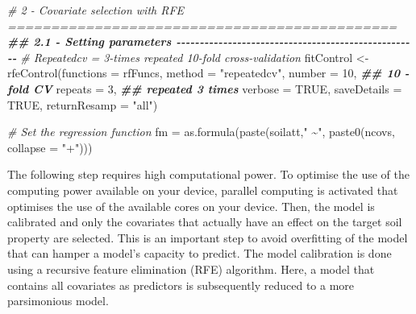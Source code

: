 \documentclass[
  10pt,
  b5paper,
  oneside]{book}
\newenvironment{Shaded}{\begin{snugshade}}{\end{snugshade}}
\newcommand{\AttributeTok}[1]{\textcolor[rgb]{0.77,0.63,0.00}{#1}}
\newcommand{\CommentTok}[1]{\textcolor[rgb]{0.56,0.35,0.01}{\textit{#1}}}
\newcommand{\ConstantTok}[1]{\textcolor[rgb]{0.00,0.00,0.00}{#1}}
\newcommand{\DecValTok}[1]{\textcolor[rgb]{0.00,0.00,0.81}{#1}}
\newcommand{\DocumentationTok}[1]{\textcolor[rgb]{0.56,0.35,0.01}{\textbf{\textit{#1}}}}
\newcommand{\FunctionTok}[1]{\textcolor[rgb]{0.00,0.00,0.00}{#1}}
\newcommand{\NormalTok}[1]{#1}
\newcommand{\OtherTok}[1]{\textcolor[rgb]{0.56,0.35,0.01}{#1}}
\newcommand{\StringTok}[1]{\textcolor[rgb]{0.31,0.60,0.02}{#1}}
\begin{document}
\begin{Shaded}
\begin{Highlighting}[]
\CommentTok{\# 2 {-} Covariate selection with RFE =============================================}
\DocumentationTok{\#\# 2.1 {-} Setting parameters {-}{-}{-}{-}{-}{-}{-}{-}{-}{-}{-}{-}{-}{-}{-}{-}{-}{-}{-}{-}{-}{-}{-}{-}{-}{-}{-}{-}{-}{-}{-}{-}{-}{-}{-}{-}{-}{-}{-}{-}{-}{-}{-}{-}{-}{-}{-}{-}{-}{-}{-}{-}}
\CommentTok{\# Repeatedcv = 3{-}times repeated 10{-}fold cross{-}validation}
\NormalTok{fitControl }\OtherTok{\textless{}{-}} \FunctionTok{rfeControl}\NormalTok{(}\AttributeTok{functions =}\NormalTok{ rfFuncs,}
                         \AttributeTok{method =} \StringTok{"repeatedcv"}\NormalTok{,}
                         \AttributeTok{number =} \DecValTok{10}\NormalTok{,         }\DocumentationTok{\#\# 10 {-}fold CV}
                         \AttributeTok{repeats =} \DecValTok{3}\NormalTok{,        }\DocumentationTok{\#\# repeated 3 times}
                         \AttributeTok{verbose =} \ConstantTok{TRUE}\NormalTok{,}
                         \AttributeTok{saveDetails =} \ConstantTok{TRUE}\NormalTok{, }
                         \AttributeTok{returnResamp =} \StringTok{"all"}\NormalTok{)}

\CommentTok{\# Set the regression function}
\NormalTok{fm }\OtherTok{=} \FunctionTok{as.formula}\NormalTok{(}\FunctionTok{paste}\NormalTok{(soilatt,}\StringTok{" \textasciitilde{}"}\NormalTok{, }\FunctionTok{paste0}\NormalTok{(ncovs,}
                                             \AttributeTok{collapse =} \StringTok{"+"}\NormalTok{)))}
\end{Highlighting}
\end{Shaded}

The following step requires high computational power. To optimise the use of the computing power available on your device, parallel computing is activated that optimises the use of the available cores on your device. Then, the model is calibrated and only the covariates that actually have an effect on the target soil property are selected. This is an important step to avoid overfitting of the model that can hamper a model's capacity to predict.
The model calibration is done using a recursive feature elimination (RFE) algorithm. Here, a model that contains all covariates as predictors is subsequently reduced to a more parsimonious model.
\end{document}
